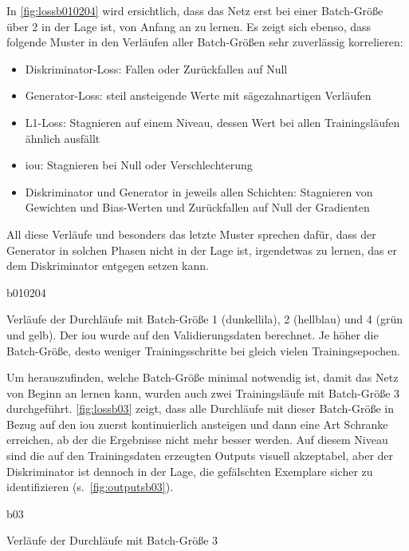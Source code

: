 In \autoref{fig:lossb010204} wird ersichtlich, dass das Netz erst bei einer Batch-Größe über 2 in der Lage ist, von Anfang an zu lernen.
Es zeigt sich ebenso, dass folgende Muster in den Verläufen aller Batch-Größen sehr zuverlässig korrelieren:

\begin{itemize}
	\item Diskriminator-Loss: Fallen oder Zurückfallen auf Null 
	\item Generator-Loss: steil ansteigende Werte mit sägezahnartigen Verläufen
	\item L1-Loss: Stagnieren auf einem Niveau, dessen Wert bei allen Trainingsläufen ähnlich ausfällt
	\item \gls{iou}: Stagnieren bei Null oder Verschlechterung
	\item Diskriminator und Generator in jeweils allen Schichten: Stagnieren von Gewichten und Bias-Werten und Zurückfallen auf Null der Gradienten
\end{itemize}

All diese Verläufe und besonders das letzte Muster sprechen dafür, dass der Generator in solchen Phasen nicht in der Lage ist, irgendetwas zu lernen, das er dem Diskriminator entgegen setzen kann.

\begin{losses}{b010204}
	\caption[Verläufe der Durchläufe mit Batch-Größe 1, 2 und 4]{Verläufe der Durchläufe mit Batch-Größe 1 (dunkellila), 2 (hellblau) und 4 (grün und gelb). Der \gls{iou} wurde auf den Validierungsdaten berechnet. Je höher die Batch-Größe, desto weniger Trainingsschritte bei gleich vielen Trainingsepochen.}
	\label{fig:lossb010204}
\end{losses}


Um herauszufinden, welche Batch-Größe minimal notwendig ist, damit das Netz von Beginn an lernen kann, wurden auch zwei Trainingsläufe mit Batch-Größe 3 durchgeführt.
\autoref{fig:lossb03} zeigt, dass alle Durchläufe mit dieser Batch-Größe in Bezug auf den \gls{iou} zuerst kontinuierlich ansteigen und dann eine Art Schranke erreichen, ab der die Ergebnisse nicht mehr besser werden.
Auf diesem Niveau sind die auf den Trainingsdaten erzeugten Outputs visuell akzeptabel, aber der Diskriminator ist dennoch in der Lage, die gefälschten Exemplare sicher zu identifizieren (s.~\autoref{fig:outputsb03}).

\begin{losses}{b03}
	\caption{Verläufe der Durchläufe mit Batch-Größe 3}
	\label{fig:lossb03}
\end{losses}

